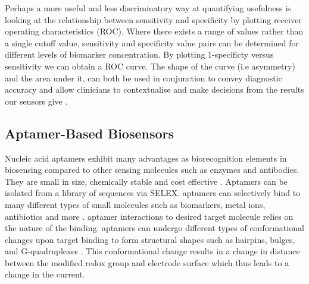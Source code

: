 Perhaps a more useful and less discriminatory way at quantifying usefulness is looking at the relationship between sensitivity and specificity by plotting receiver operating characteristics (ROC). Where there exists a range of values rather than a single cutoff value, sensitivity and specificity value pairs can be determined for different levels of biomarker concentration. By plotting 1-specificty versus sensitivity we can obtain a ROC curve. The shape of the curve (i.e asymmetry) and the area under it, can both be used in conjunction to convey diagnostic accuracy and allow clinicians to contextualise and make decisions from the results our sensors give \cite{kampfrath2013brief}. 
\subsection{Aptamer-Based Biosensors}
Nucleic acid aptamers exhibit many advantages as biorecognition elements in biosensing compared to other sensing molecules such as enzymes and antibodies. They are small in size, chemically stable and cost effective \cite{song2008aptamer}. Aptamers can be isolated from a library of sequences via SELEX. aptamers can selectively bind to many different types of small molecules such as biomarkers, metal ions, antibiotics and more \cite{cai2018investigations}. aptamer interactions to desired target molecule relies on the nature of the binding. aptamers can undergo different types of conformational changes upon target binding to form structural shapes such as hairpins, bulges, and G-quadruplexes \cite{riccitelli2010computational}. This conformational change results in a change in distance between the modified redox group and electrode surface which thus leads to a change in the current.\\\\
